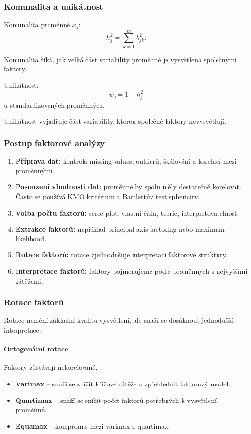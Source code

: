 \subsubsection{Komunalita a unikátnost}

Komunalita proměnné $x_j$:
\[
h_j^2
=
\sum_{k=1}^m \lambda_{jk}^2.
\]

Komunalita říká, jak velká část variability proměnné je vysvětlena společnými faktory.

Unikátnost:
\[
\psi_j = 1-h_j^2
\]
u standardizovaných proměnných.

Unikátnost vyjadřuje část variability, kterou společné faktory nevysvětlují.

\subsubsection{Postup faktorové analýzy}

\begin{enumerate}
    \item \textbf{Příprava dat:}
    kontrola missing values, outlierů, škálování a korelací mezi proměnnými.
    
    \item \textbf{Posouzení vhodnosti dat:}
    proměnné by spolu měly dostatečně korelovat. Často se používá KMO kritérium a Bartlettův test
    sphericity.
    
    \item \textbf{Volba počtu faktorů:}
    scree plot, vlastní čísla, teorie, interpretovatelnost.
    
    \item \textbf{Extrakce faktorů:}
    například principal axis factoring nebo maximum likelihood.
    
    \item \textbf{Rotace faktorů:}
    rotace zjednodušuje interpretaci faktorové struktury.
    
    \item \textbf{Interpretace faktorů:}
    faktory pojmenujeme podle proměnných s nejvyššími zátěžemi.
\end{enumerate}

\subsubsection{Rotace faktorů}

Rotace nemění základní kvalitu vysvětlení, ale snaží se dosáhnout jednodušší interpretace.

\paragraph{Ortogonální rotace.}
Faktory zůstávají nekorelované.
\begin{itemize}
    \item \textbf{Varimax} -- snaží se snížit křížové zátěže a zpřehlednit faktorový model.
    \item \textbf{Quartimax} -- snaží se snížit počet faktorů potřebných k vysvětlení proměnné.
    \item \textbf{Equamax} -- kompromis mezi varimax a quartimax.
\end{itemize}

